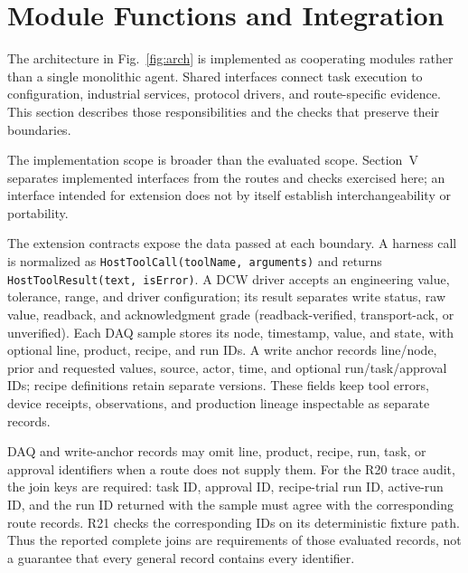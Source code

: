 \section{Module Functions and Integration}
\label{sec:modules}
The architecture in Fig.~\ref{fig:arch} is implemented as cooperating
modules rather than a single monolithic agent. Shared interfaces connect
task execution to configuration, industrial services, protocol drivers, and
route-specific evidence. This section describes those responsibilities and
the checks that preserve their boundaries.

The implementation scope is broader than the evaluated scope. Section~V
separates implemented interfaces from the routes and checks exercised here;
an interface intended for extension does not by itself establish
interchangeability or portability.

The extension contracts expose the data passed at each boundary. A harness
call is normalized as \texttt{HostToolCall(toolName, arguments)} and returns
\texttt{HostToolResult(text, isError)}. A DCW driver accepts an engineering
value, tolerance, range, and driver configuration; its result separates write
status, raw value, readback, and acknowledgment grade (readback-verified,
transport-ack, or unverified). Each DAQ sample stores its node, timestamp,
value, and state, with optional line, product, recipe, and run IDs. A write
anchor records line/node, prior and requested values, source, actor, time, and
optional run/task/approval IDs; recipe definitions retain separate versions.
These fields keep tool errors, device receipts, observations, and production
lineage inspectable as separate records.

DAQ and write-anchor records may omit line, product, recipe, run, task, or
approval identifiers when a route does not supply them. For the R20 trace
audit, the join keys are required: task ID, approval ID, recipe-trial run ID,
active-run ID, and the run ID returned with the sample must agree with the
corresponding route records. R21 checks the corresponding IDs on its
deterministic fixture path. Thus the reported complete joins are requirements
of those evaluated records, not a guarantee that every general record
contains every identifier.

